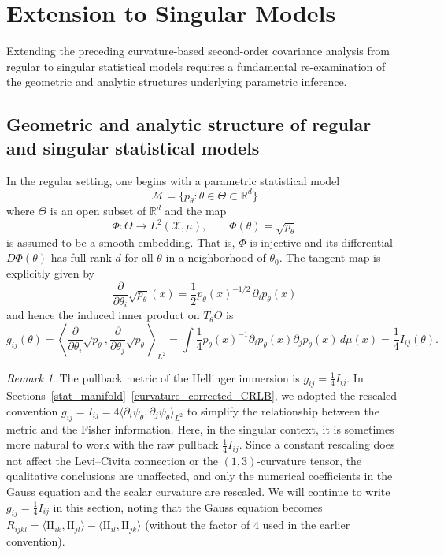 \documentclass[11pt,letterpaper]{amsart}
\numberwithin{equation}{section}
\theoremstyle{plain}
\theoremstyle{definition}
\theoremstyle{remark}
\newtheorem{remark}[theorem]{Remark}
\begin{document}
\section{Extension to Singular Models}\label{sec:singular_models}

Extending the preceding curvature-based second-order covariance analysis from regular to singular statistical models requires a fundamental re-examination of the geometric and analytic structures underlying parametric inference.

\subsection{Geometric and analytic structure of regular and singular statistical models}

In the regular setting, one begins with a parametric statistical model
\[
\mathcal{M} = \{ p_\theta : \theta \in \Theta \subset \mathbb{R}^d \}
\]
where $\Theta$ is an open subset of $\mathbb{R}^d$ and the map
\[
\Phi : \Theta \to L^2(\mathcal{X}, \mu), \qquad \Phi(\theta) = \sqrt{p_\theta}
\]
is assumed to be a smooth embedding. That is, $\Phi$ is injective and its differential $D\Phi(\theta)$ has full rank $d$ for all $\theta$ in a neighborhood of $\theta_0$. The tangent map is explicitly given by
\[
\frac{\partial}{\partial \theta_i} \sqrt{p_\theta}(x)
=
\frac{1}{2} p_\theta(x)^{-1/2} \, \partial_i p_\theta(x)
\]
and hence the induced inner product on $T_\theta \Theta$ is
\[
g_{ij}(\theta)
= \left\langle \frac{\partial}{\partial \theta_i} \sqrt{p_\theta}, \frac{\partial}{\partial \theta_j} \sqrt{p_\theta} \right\rangle_{L^2}
=
\int \frac{1}{4} p_\theta(x)^{-1} \partial_i p_\theta(x) \partial_j p_\theta(x) \, d\mu(x)
=
\frac{1}{4} I_{ij}(\theta).
\]

\begin{remark}
The pullback metric of the Hellinger immersion is \(g_{ij}=\frac14 I_{ij}\). In Sections~\ref{stat_manifold}--\ref{curvature_corrected_CRLB}, we adopted the rescaled convention \(g_{ij}=I_{ij}=4\langle \partial_i\psi_\theta,\partial_j\psi_\theta\rangle_{L^2}\) to simplify the relationship between the metric and the Fisher information. Here, in the singular context, it is sometimes more natural to work with the raw pullback \(\frac14 I_{ij}\). Since a constant rescaling does not affect the Levi--Civita connection or the \((1,3)\)-curvature tensor, the qualitative conclusions are unaffected, and only the numerical coefficients in the Gauss equation and the scalar curvature are rescaled. We will continue to write \(g_{ij}=\frac14 I_{ij}\) in this section, noting that the Gauss equation becomes \(R_{ijkl}=\langle \mathrm{II}_{ik},\mathrm{II}_{jl}\rangle - \langle \mathrm{II}_{il},\mathrm{II}_{jk}\rangle\) (without the factor of \(4\) used in the earlier convention).
\end{remark}
\end{document}
